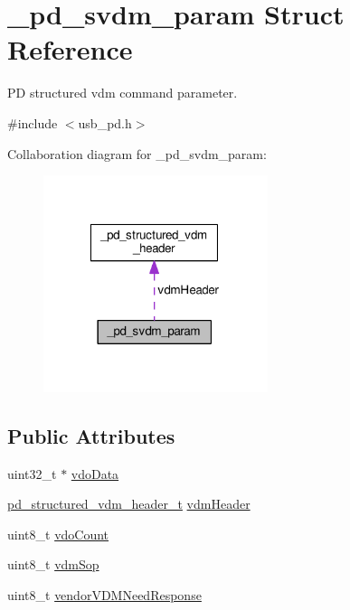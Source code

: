 \hypertarget{struct__pd__svdm__param}{\section{\-\_\-pd\-\_\-svdm\-\_\-param Struct Reference}
\label{struct__pd__svdm__param}
}


P\-D structured vdm command parameter.  




{\ttfamily \#include $<$usb\-\_\-pd.\-h$>$}



Collaboration diagram for \-\_\-pd\-\_\-svdm\-\_\-param\-:
\nopagebreak
\begin{figure}[H]
\begin{center}
\leavevmode
\includegraphics[width=186pt]{struct__pd__svdm__param__coll__graph}
\end{center}
\end{figure}
\subsection*{Public Attributes}
\begin{DoxyCompactItemize}
\item 
uint32\-\_\-t $\ast$ \hyperlink{struct__pd__svdm__param_a1da6696ea0b07e0173cc469094639e99}{vdo\-Data}
\item 
\hyperlink{group__usb__pd__stack_ga245b8bec3f3b7771e73016ac98595570}{pd\-\_\-structured\-\_\-vdm\-\_\-header\-\_\-t} \hyperlink{struct__pd__svdm__param_aaebc50d834d15e862f264a4e4d8421b4}{vdm\-Header}
\item 
uint8\-\_\-t \hyperlink{struct__pd__svdm__param_a153be4aa8e8fa9e41ac83eb41e513060}{vdo\-Count}
\item 
uint8\-\_\-t \hyperlink{struct__pd__svdm__param_a8047c38bf19593f6d467256b1696587e}{vdm\-Sop}
\item 
uint8\-\_\-t \hyperlink{struct__pd__svdm__param_a2a41729be5b45c14a61c39498b0f43be}{vendor\-V\-D\-M\-Need\-Response}
\end{DoxyCompactItemize}


